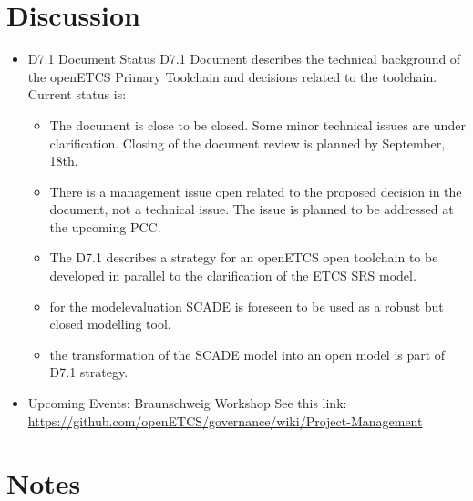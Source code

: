 \documentclass[a4paper, 11pt]{article}
\begin{document}
\section{Discussion}
\begin{itemize}
\item D7.1 Document Status
D7.1 Document describes the technical background of the openETCS Primary Toolchain and decisions related to the toolchain.
Current status is:
\begin{itemize}
\item The document is close to be closed. Some minor technical issues are under clarification. Closing of the document review is planned by September, 18th. 
\item There is a management issue open related to the proposed decision in the document, not a technical issue. The issue is planned to be addressed at the upcoming PCC.
\item The D7.1 describes a strategy for an openETCS open toolchain to be developed in parallel to the clarification of the ETCS SRS model.
\item for the modelevaluation SCADE is foreseen to be used as  a robust but closed modelling tool.
\item the transformation of the SCADE model into an open model is part of D7.1 strategy.
\end{itemize}

\item Upcoming Events: Braunschweig Workshop
See this link: \url{https://github.com/openETCS/governance/wiki/Project-Management}

\end{itemize}

\section{Notes}
\end{document}

